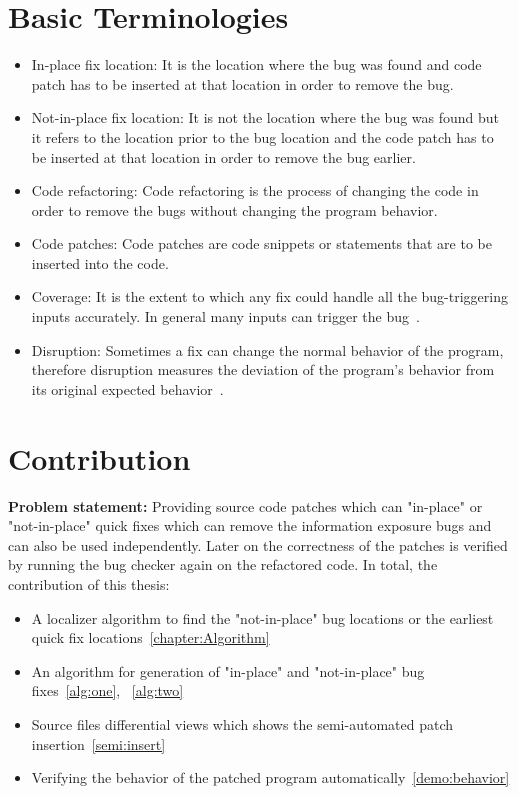 \section{Basic Terminologies}
\begin{itemize}
 \item In-place fix location:
 It is the location where the bug was found and code patch has to be
 inserted at that location in order to remove the bug.
 \item Not-in-place fix location:
 It is not the location where the bug was found but it refers to the location 
 prior to the bug location and the code patch has to be inserted at that
 location in order to remove the bug earlier.
 \item Code refactoring:
 Code refactoring is the process of changing the code in order to remove
 the bugs without changing the program behavior.
 \item Code patches:
 Code patches are code snippets or statements that are to be inserted
 into the code.
 \item Coverage: It is the extent to which any fix could handle all the bug-triggering
 inputs accurately. In general many inputs can trigger the bug~\cite{Gu:fix}.
 
 \item Disruption:
 Sometimes a fix can change the normal behavior of the program, therefore disruption measures
 the deviation of the program's behavior from its original expected behavior~\cite{Gu:fix}.
 
\end{itemize}


\section{Contribution}
\textbf{Problem statement:} Providing source code patches which can "in-place" or "not-in-place" quick fixes
which can remove the information exposure bugs and can also be used independently. Later on the correctness of the patches
is verified by running the bug checker again on the refactored code.
In total, the contribution of this thesis:
\begin{itemize}
\item A localizer algorithm to find the "not-in-place" bug locations or the earliest quick fix locations~\ref{chapter:Algorithm}
\item An algorithm for generation of "in-place" and "not-in-place" bug fixes~\ref{alg:one}, ~\ref{alg:two}
\item Source files differential views which shows the semi-automated patch insertion~\ref{semi:insert}
\item Verifying the behavior of the patched program automatically~\ref{demo:behavior}
\end{itemize}


